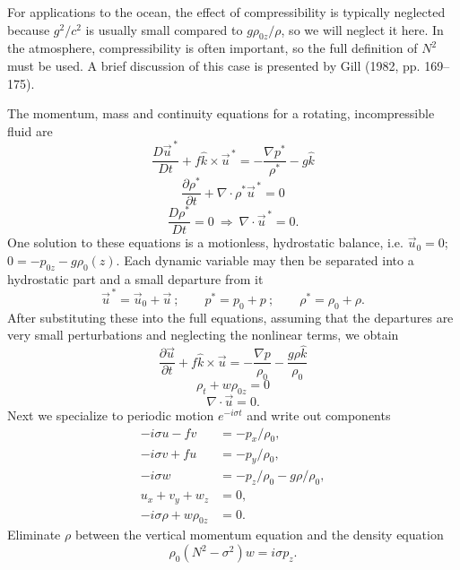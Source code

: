 For applications to the ocean, the effect of compressibility is typically neglected
because $g^2/c^2$ is usually small compared to $g\rho_{0z}/\rho$, so we will neglect it here. In the
atmosphere, compressibility is often important, so the full definition of $N^2$ must be
used. A brief discussion of this case is presented by Gill (1982, pp. 169--175).

\sourcepagebreak

The momentum, mass and continuity equations for a rotating, incompressible
fluid are
\[
	\frac{D\vec u^{\,*}}{Dt}+f\hat k\times\vec u^{\,*}
	=-\frac{\nabla p^*}{\rho^*}-g\hat k
\]
\[
	\frac{\partial\rho^*}{\partial t}+\nabla\cdot\rho^*\vec u^{\,*}=0
\]
\[
	\frac{D\rho^*}{Dt}=0\ \Rightarrow\ \nabla\cdot\vec u^{\,*}=0.
\]
One solution to these equations is a motionless, hydrostatic balance, i.e.
$\vec u_0=0$; $0=-p_{0z}-g\rho_0(z)$. Each dynamic variable may then be separated into a
hydrostatic part and a small departure from it
\[
	\vec u^{\,*}=\vec u_0+\vec u\ ;\qquad p^*=p_0+p\ ;\qquad \rho^*=\rho_0+\rho.
\]
After substituting these into the full equations, assuming that the departures are very
small perturbations and neglecting the nonlinear terms, we obtain
\[
	\frac{\partial\vec u}{\partial t}+f\hat k\times\vec u
	=-\frac{\nabla p}{\rho_0}-\frac{g\rho\hat k}{\rho_0}
\]
\[
	\rho_t+w\rho_{0z}=0
\]
\[
	\nabla\cdot\vec u=0.
\]
Next we specialize to periodic motion $e^{-i\sigma t}$ and write out components
\begin{align*}
	-i\sigma u-fv           & =-p_x/\rho_0,              \\
	-i\sigma v+fu           & =-p_y/\rho_0,              \\
	-i\sigma w              & =-p_z/\rho_0-g\rho/\rho_0, \\
	u_x+v_y+w_z             & =0,                        \\
	-i\sigma\rho+w\rho_{0z} & =0.
\end{align*}
Eliminate $\rho$ between the vertical momentum equation and the density equation
\[
	\rho_0(N^2-\sigma^2)w=i\sigma p_z.
\]

\sourcepagebreak


